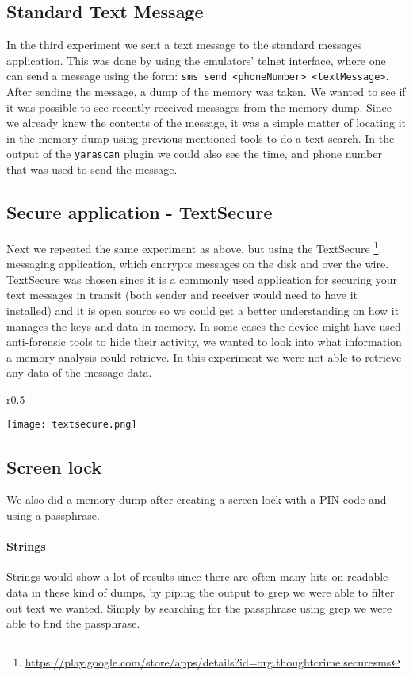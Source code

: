 \subsection{Standard Text Message}
In the third experiment we sent a text message to the standard messages application.
This was done by using the emulators’ telnet interface, where one can send a message
using the form: \texttt{sms send <phoneNumber> <textMessage>}. After sending the
message, a dump of the memory was taken. We wanted to see if it was possible to 
see recently received messages from the memory dump. Since we already knew the 
contents of the message, it was a simple matter of locating it in the memory 
dump using previous mentioned tools to do a text search. In the output of the
\texttt{yarascan} plugin we could also see the time, and phone number that was
used to send the message.
  
\subsection{Secure application - TextSecure}
Next we repeated the same experiment as above, but using the TextSecure
\footnote{\url{https://play.google.com/store/apps/details?id=org.thoughtcrime.securesms}}, 
messaging application, which encrypts messages on the disk and over the wire.
TextSecure was chosen since it is a commonly used application for securing your 
text messages in transit (both sender and receiver would need to have it 
installed) and it is open source so we could get a better understanding on 
how it manages the keys and data in memory.  
In some cases the device might have used anti-forensic tools to hide their 
activity, we wanted to look into what information a memory analysis could 
retrieve. In this experiment we were not able to retrieve any data of the message 
data.
\begin{wrapfigure}{r}{0.5\textwidth}
    \begin{center}
        \texttt{[image: textsecure.png]}
    \end{center}
\end{wrapfigure}

\subsection{Screen lock}
We also did a memory dump after creating a screen lock with a PIN code and using a passphrase.
  \paragraph{Strings}
  Strings would show a lot of results since there are often many hits on readable 
  data in these kind of dumps, by piping the output to grep we were able to 
  filter out text we wanted. Simply by searching for the passphrase using grep we were able to 
  find the passphrase.

